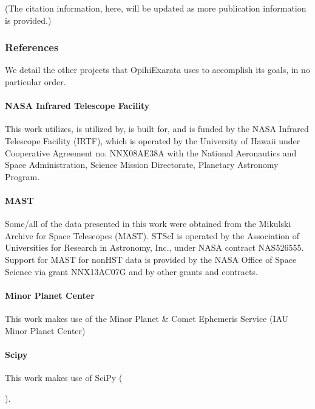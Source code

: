 \documentclass[letterpaper,11pt,english]{sphinxmanual}
\begin{document}
\sphinxAtStartPar
(The citation information, here, will be updated as more publication
information is provided.)


\subsubsection{References}
\label{\detokenize{user/citations:references}}
\sphinxAtStartPar
We detail the other projects that OpihiExarata uses to accomplish its goals,
in no particular order.


\paragraph{NASA Infrared Telescope Facility}
\label{\detokenize{user/citations:nasa-infrared-telescope-facility}}
\sphinxAtStartPar
This work utilizes, is utilized by, is built for, and is funded by the NASA
Infrared Telescope Facility (IRTF), which is operated by the University of
Hawaii under Cooperative Agreement no. NNX\sphinxhyphen{}08AE38A with the National
Aeronautics and Space Administration, Science Mission Directorate, Planetary
Astronomy Program.


\paragraph{MAST}
\label{\detokenize{user/citations:mast}}
\sphinxAtStartPar
Some/all of the data presented in this work were obtained from the Mikulski
Archive for Space Telescopes (MAST). STScI is operated by the Association of
Universities for Research in Astronomy, Inc., under NASA contract NAS5\sphinxhyphen{}26555.
Support for MAST for non\sphinxhyphen{}HST data is provided by the NASA Office of Space
Science via grant NNX13AC07G and by other grants and contracts.


\paragraph{Minor Planet Center}
\label{\detokenize{user/citations:minor-planet-center}}
\sphinxAtStartPar
This work makes use of the Minor Planet \& Comet Ephemeris Service (IAU Minor
Planet Center)


\paragraph{Scipy}
\label{\detokenize{user/citations:scipy}}
\sphinxAtStartPar
This work makes use of SciPy
(%
\begin{footnote}[11]\sphinxAtStartFootnote
{}
%
\end{footnote}).
\end{document}
